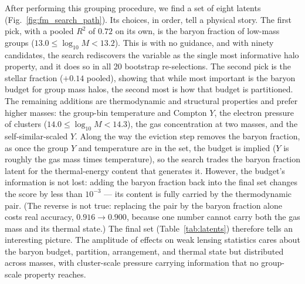 \documentclass[linenumbers,trackchanges, twocolumn]{aastex701}
\begin{document}
After performing this grouping procedure, we find a set of eight latents (Fig.~\ref{fig:fm_search_path}). Its choices, in order, tell a physical story. The first pick, with a pooled $R^2$ of $0.72$ on its own, is the baryon fraction of low-mass groups ($13.0 \le \log_{10} M < 13.2$). This is with no guidance, and with ninety candidates, the search rediscovers the \citet{vanDaalen2020} variable as the single most informative halo property, and it does so in all 20 bootstrap re-selections. The second pick is the stellar fraction ($+0.14$ pooled), showing that while most important is the baryon budget for group mass halos, the second most is how that budget is partitioned. The remaining additions are thermodynamic and structural properties and prefer higher masses: the group-bin temperature and Compton $Y$, the electron pressure of clusters ($14.0 \le \log_{10} M < 14.3$), the gas concentration at two masses, and the self-similar-scaled $Y$. Along the way the eviction step removes the baryon fraction, as once the group $Y$ and temperature are in the set, the budget is implied ($Y$ is roughly the gas mass times temperature), so the search trades the baryon fraction latent for the thermal-energy content that generates it. However, the budget's information is not lost: adding the baryon fraction back into the final set changes the score by less than $10^{-3}$ --- its content is fully carried by the thermodynamic pair. (The reverse is not true: replacing the pair by the baryon fraction alone costs real accuracy, $0.916 \to 0.900$, because one number cannot carry both the gas mass and its thermal state.) The final set (Table~\ref{tab:latents}) therefore tells an interesting picture. The amplitude of effects on weak lensing statistics cares about the baryon budget, partition, arrangement, and thermal state but distributed across masses, with cluster-scale pressure carrying information that no group-scale property reaches.
\end{document}
